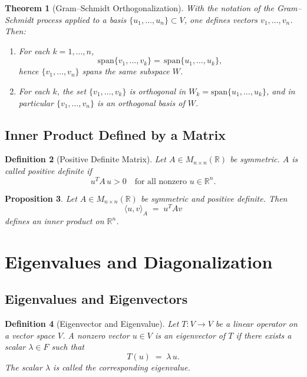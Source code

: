 \documentclass[12pt]{article}
\theoremstyle{break}             %
\newtheorem{thm}{Theorem}          %
\newtheorem{prop}[thm]{Proposition}%
\newtheorem{defn}[thm]{Definition}
\begin{document}
\begin{thm}[Gram–Schmidt Orthogonalization]
With the notation of the Gram–Schmidt process applied to a basis \(\{u_1,\dots,u_n\}\subset V\), one defines vectors \(v_1,\dots,v_n\).  Then:
\begin{enumerate}
  \item For each \(k=1,\dots,n\),
  \[
    \mathrm{span}\{v_1,\dots,v_k\}
    =\,\mathrm{span}\{u_1,\dots,u_k\},
  \]
  hence \(\{v_1,\dots,v_n\}\) spans the same subspace \(W\).
  \item For each \(k\), the set \(\{v_1,\dots,v_k\}\) is orthogonal in 
  \(W_k=\mathrm{span}\{u_1,\dots,u_k\}\), and in particular 
  \(\{v_1,\dots,v_n\}\) is an orthogonal basis of \(W\).
\end{enumerate}
\end{thm}

\subsection{Inner Product Defined by a Matrix}

\begin{defn}[Positive Definite Matrix]
Let \(A\in M_{n\times n}(\mathbb{R})\) be symmetric.  \(A\) is called \emph{positive definite} if
\[
u^T A\,u > 0
\quad\text{for all nonzero }u\in\mathbb{R}^n.
\]
\end{defn}

\begin{prop}
Let \(A\in M_{n\times n}(\mathbb R)\) be symmetric and positive definite.  Then
\[
\langle u,v\rangle_A \;=\; u^T A v
\]
defines an inner product on \(\mathbb R^n\).
\end{prop}

\section{Eigenvalues and Diagonalization}

\subsection{Eigenvalues and Eigenvectors}

\begin{defn}[Eigenvector and Eigenvalue]
Let \(T\colon V\to V\) be a linear operator on a vector space \(V\).  A nonzero vector \(u\in V\) is an \emph{eigenvector} of \(T\) if there exists a scalar \(\lambda\in F\) such that
\[
T(u) \;=\;\lambda\,u.
\]
The scalar \(\lambda\) is called the corresponding \emph{eigenvalue}.
\end{defn}
\end{document}
